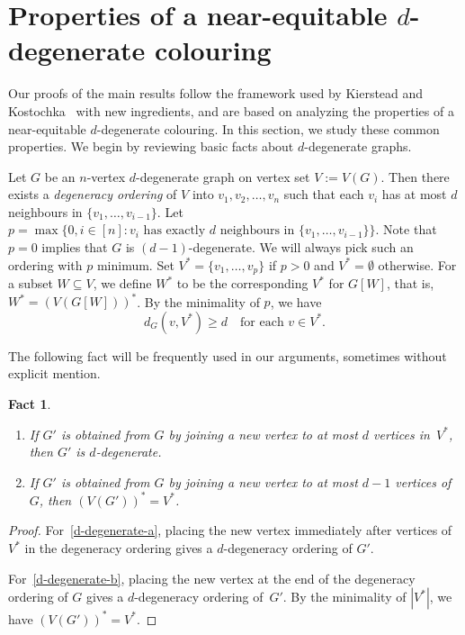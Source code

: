 \documentclass[11pt]{article}
\theoremstyle{plain}
\newtheorem{fact}[thm]{Fact}
\numberwithin{equation}{section}
\begin{document}
\section{Properties of a near-equitable  $d$-degenerate colouring}\label{sec:property}

Our proofs of the main results  follow the framework used by Kierstead and Kostochka~\cite{KK2008} with new ingredients, and  are based on analyzing the properties of a near-equitable
$d$-degenerate colouring.    In this section,  we study  these common properties.
We begin by reviewing basic facts about  $d$-degenerate graphs.

Let $G$ be an $n$-vertex $d$-degenerate graph on vertex set $V:=V(G)$. Then there exists a \emph{degeneracy ordering} of $V$ into $v_1, v_2,\ldots, v_n$ such that each $v_i$ has at most $d$ neighbours in $\{v_1,\ldots,v_{i-1}\}$. Let $p=\max\{0, i \in [n] \colon \text{$v_{i}$ has exactly $d$ neighbours in $\{v_1,\ldots,v_{i-1}\}$}\}$. Note that $p=0$ implies that $G$ is $(d-1)$-degenerate. We will always pick such an ordering with $p$ minimum. Set $V^{*}=\{v_1,\ldots,v_p\}$ if $p>0$ and $V^{*}=\emptyset$ otherwise. For a subset $W\subseteq V$, we define $W^{*}$ to be the corresponding $V^{*}$ for $G[W]$, that is, $W^{*}=(V(G[W]))^{*}$. By the minimality of $p$,
    we have
    \begin{equation}\label{eqn:V^*-vertex-degree}
    d_G(v, V^*) \ge d \quad \text{for  each $v\in V^*$.}
    \end{equation}


The following fact  will be frequently used in  our arguments, sometimes without explicit mention.

\begin{fact}\label{lemma:d-degenerate}~
	\begin{enumerate}[label={\rm(\alph*)}, start=1]
		\item  If $G'$ is obtained from $G$ by joining a new vertex to  at most $d$
		vertices in~$V^{*}$, then $G'$ is $d$-degenerate.\label{d-degenerate-a}
		\item 	 	If $G'$  is obtained
		from $G$ by joining a new vertex to  at most $d-1$
		vertices  of $G$, then $(V(G'))^{*}=V^{*}$.\label{d-degenerate-b}
\end{enumerate}
\end{fact}

\begin{proof}  For~\ref{d-degenerate-a}, placing the new vertex immediately after vertices of $V^{*}$ in the degeneracy ordering gives a $d$-degeneracy ordering of $G'$.

For~\ref{d-degenerate-b}, placing the new vertex at the end of the degeneracy ordering of $G$ gives a $d$-degeneracy ordering of~$G'$. By the minimality of $|V^*|$, we have  $(V(G'))^{*}=V^{*}$.
\end{proof}
\end{document}
